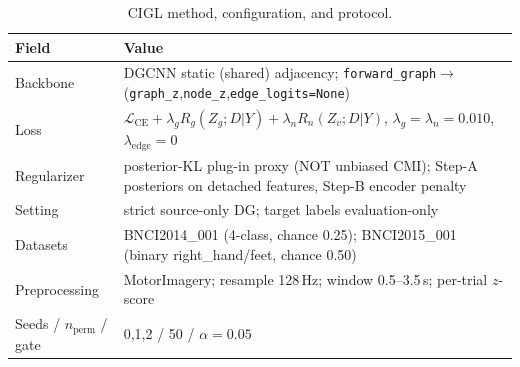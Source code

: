 \begin{table}[t]
\centering
\caption{CIGL method, configuration, and protocol.}
\label{tab:method_protocol}
\small
\begin{tabular}{ll}
\toprule
Field & Value \\
\midrule
Backbone        & DGCNN static (shared) adjacency; \texttt{forward\_graph}$\to$(\texttt{graph\_z},\texttt{node\_z},\texttt{edge\_logits=None}) \\
Loss            & $\mathcal{L}_{\mathrm{CE}} + \lambda_g R_g(Z_g;D|Y) + \lambda_n R_n(Z_v;D|Y)$,\; $\lambda_g=\lambda_n=0.010$,\; $\lambda_{\mathrm{edge}}=0$ \\
Regularizer     & posterior-KL plug-in proxy (NOT unbiased CMI); Step-A posteriors on detached features, Step-B encoder penalty \\
Setting         & strict source-only DG; target labels evaluation-only \\
Datasets        & BNCI2014\_001 (4-class, chance 0.25); BNCI2015\_001 (binary right\_hand/feet, chance 0.50) \\
Preprocessing   & MotorImagery; resample 128\,Hz; window 0.5--3.5\,s; per-trial $z$-score \\
Seeds / $n_{\mathrm{perm}}$ / gate & 0,1,2 / 50 / $\alpha=0.05$ \\
\bottomrule
\end{tabular}
\end{table}
